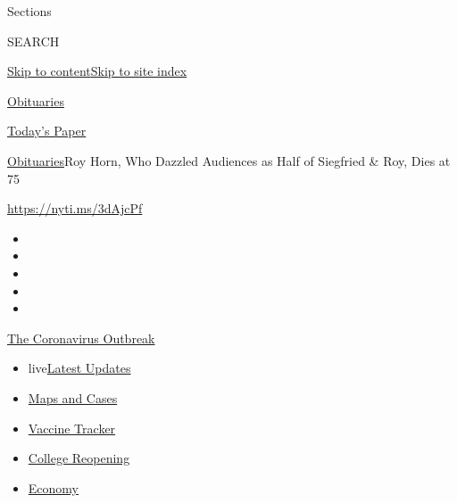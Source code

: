 Sections

SEARCH

\protect\hyperlink{site-content}{Skip to
content}\protect\hyperlink{site-index}{Skip to site index}

\href{https://www.nytimes.com/section/obituaries}{Obituaries}

\href{https://myaccount.nytimes.com/auth/login?response_type=cookie\&client_id=vi}{}

\href{https://www.nytimes.com/section/todayspaper}{Today's Paper}

\href{/section/obituaries}{Obituaries}\textbar{}Roy Horn, Who Dazzled
Audiences as Half of Siegfried \& Roy, Dies at 75

\url{https://nyti.ms/3dAjcPf}

\begin{itemize}
\item
\item
\item
\item
\item
\end{itemize}

\href{https://www.nytimes.com/news-event/coronavirus?action=click\&pgtype=Article\&state=default\&region=TOP_BANNER\&context=storylines_menu}{The
Coronavirus Outbreak}

\begin{itemize}
\tightlist
\item
  live\href{https://www.nytimes.com/2020/08/03/world/coronavirus-covid-19.html?action=click\&pgtype=Article\&state=default\&region=TOP_BANNER\&context=storylines_menu}{Latest
  Updates}
\item
  \href{https://www.nytimes.com/interactive/2020/us/coronavirus-us-cases.html?action=click\&pgtype=Article\&state=default\&region=TOP_BANNER\&context=storylines_menu}{Maps
  and Cases}
\item
  \href{https://www.nytimes.com/interactive/2020/science/coronavirus-vaccine-tracker.html?action=click\&pgtype=Article\&state=default\&region=TOP_BANNER\&context=storylines_menu}{Vaccine
  Tracker}
\item
  \href{https://www.nytimes.com/2020/08/02/us/covid-college-reopening.html?action=click\&pgtype=Article\&state=default\&region=TOP_BANNER\&context=storylines_menu}{College
  Reopening}
\item
  \href{https://www.nytimes.com/live/2020/08/03/business/stock-market-today-coronavirus?action=click\&pgtype=Article\&state=default\&region=TOP_BANNER\&context=storylines_menu}{Economy}
\end{itemize}

